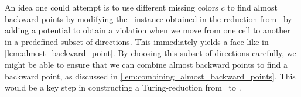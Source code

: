 An idea one could attempt is to use different missing colors $c$ to find almost backward points by modifying the \EndOfLine\ instance obtained in the reduction from \Tarskistar\ by adding a potential to obtain a violation when we move from one cell to another in a predefined subset of directions. This immediately yields a face like in \cref{lem:almost_backward_point}. By choosing this subset of directions carefully, we might be able to ensure that we can combine almost backward points to find a backward point, as discussed in \cref{lem:combining_almost_backward_points}. This would be a key step in constructing a Turing-reduction from \Tarskistar\ to \EndOfPotentialLine\@.


